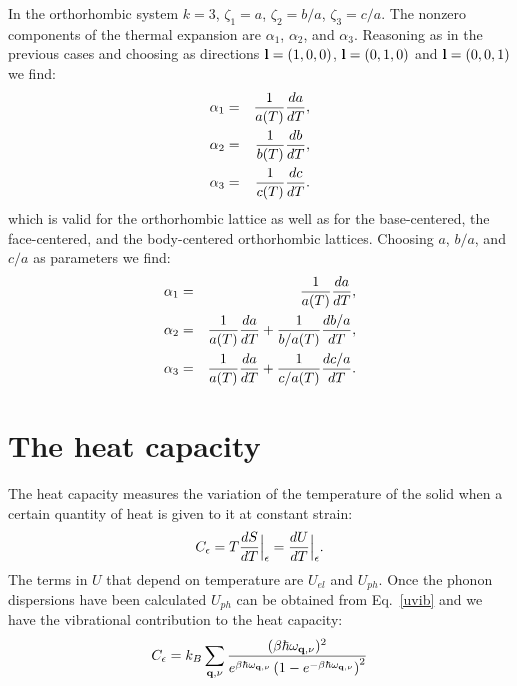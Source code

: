 \documentclass[12pt,a4paper,twoside]{report}
\begin{document}
In the orthorhombic system $k=3$, $\zeta_1=a$, $\zeta_2=b/a$, 
$\zeta_3=c/a$. The nonzero components of the thermal expansion are 
$\alpha_{1}$, $\alpha_{2}$, and $\alpha_{3}$. 
Reasoning as in the previous cases and choosing as directions
${\bf l}=(1,0,0)$, ${\bf l}=(0,1,0)$ and ${\bf l}=(0,0,1)$ we find:  
\begin{eqnarray}
\alpha_{1} &=&  {1\over a(T) } {d a \over dT}, \\ 
\alpha_{2} &=&  {1\over b(T) } {d b \over dT}, \\
\alpha_{3} &=&  {1\over c(T) } {d c \over dT}.
\end{eqnarray}
which is valid for the orthorhombic lattice as well as for the
base-centered, the face-centered, and the body-centered orthorhombic lattices.
Choosing $a$, $b/a$, and $c/a$ as parameters we find:
\begin{eqnarray}
\alpha_1 &=& {1\over a(T)} {d a \over dT}, \\
\alpha_2 &=& {1\over a(T)} {da \over d T}  + {1\over b/a(T)} {d b/a \over dT}, \\
\alpha_3 &=& {1\over a(T)} {da \over d T}  + {1\over c/a(T)} {d c/a \over dT}.
\end{eqnarray}



\newpage
{\color{dark-blue}\chapter{The heat capacity}}
\color{black}

The heat capacity measures the variation of the temperature of the solid
when a certain quantity of heat is given to it at constant strain:
\begin{equation}
C_\epsilon= T {d S \over dT}\Big|_\epsilon = { d U \over d T}\Big|_\epsilon.
\label{heat_cap_ce}
\end{equation}
The terms in $U$ that depend on temperature are $U_{el}$ and $U_{ph}$. 
Once the phonon dispersions 
have been calculated $U_{ph}$ can be obtained from Eq.~\ref{uvib} and
we have the vibrational contribution to the heat capacity:
\begin{equation}
C_{\epsilon} =  k_B \sum_{{\bf q},\nu} {(\beta\hbar \omega_{{\bf q},\nu})^2\over
e^{\beta \hbar \omega_{{\bf q},\nu}} \left(1-
e^{-\beta \hbar \omega_{{\bf q},\nu}}\right)^2}
\end{equation}
\end{document}
